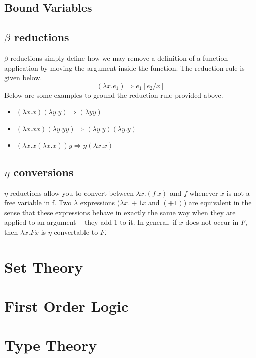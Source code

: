 \documentclass[a4paper,11pt]{article}
\begin{document}
\subsection{Bound Variables}

\subsection{$\beta$ reductions}
$\beta$ reductions simply define how we may remove a definition of a function application by moving the argument inside the function. The reduction rule is given below. 
$$
(\lambda x . e_1) \Rightarrow e_1[e_2/x]
$$
Below are some examples to ground the reduction rule provided above. 
\begin{itemize}
  \item $(\lambda x . x) (\lambda y . y) \Rightarrow (\lambda y y)$
  \item $(\lambda x . x x) (\lambda y . y y) \Rightarrow (\lambda y . y) (\lambda y . y)$
  \item $(\lambda x . x (\lambda x . x)) y \Rightarrow y (\lambda x . x )$
\end{itemize}

\subsection{$\eta$ conversions}
$\eta$ reductions allow you to convert between $\lambda x . (f \ x)$ and $f$ whenever $x$ is not a free variable 
in f. Two $\lambda$ expressions ($\lambda x . + 1 x$ and $(+ 1)$) are equivalent in the sense that these expressions behave in exactly the same way 
when they are applied to an argument -- they add 1 to it. In general, if $x$ does not occur in $F$, then $\lambda x . F x$ is $\eta$-convertable to $F$.

\section{Set Theory}

\section{First Order Logic}

\section{Type Theory}
\end{document}
